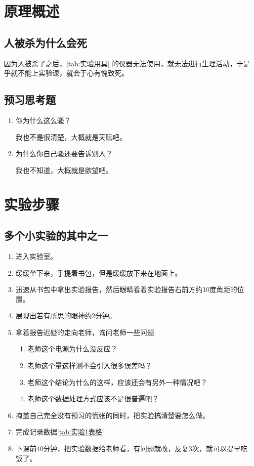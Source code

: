 \documentclass[no-math,zihao = -4]{ctexart} %
\begin{document}
\section{原理概述}
    \subsection{人被杀为什么会死}
        因为人被杀了之后，\autoref{tab:实验用具} 的仪器无法使用，就无法进行生理活动，于是乎就不能上实验课，就会于心有愧致死。

    \subsection{预习思考题}
        \begin{enumerate}
            \item 你为什么这么骚？
            \begin{ans}
                我也不是很清楚，大概就是天赋吧。
            \end{ans}

            \item 为什么你自己骚还要告诉别人？
            \begin{ans}
                我也不知道，大概就是欲望吧。
            \end{ans}
        \end{enumerate}
\section{实验步骤}
    \subsection{多个小实验的其中之一}
        \begin{enumerate}
            \item 进入实验室。
            \item 缓缓坐下来，手提着书包，但是缓缓放下来在地面上。
            \item 迅速从书包中拿出实验报告，然后眼睛看着实验报告右前方约10度角距的位置。
            \item 展现出若有所思的眼神约2分钟。
            \item 拿着报告迟疑的走向老师，询问老师一些问题
                \begin{enumerate}
                    \item 老师这个电源为什么没反应？
                    \item 老师这个量这样测不会引入很多误差吗？
                    \item 老师这个结论为什么的这样，应该还会有另外一种情况吧？
                    \item 老师这个数据处理方式应该不是很普遍吧？
                \end{enumerate}
            \item 掩盖自己完全没有预习的慌张的同时，把实验搞清楚要怎么做。
            \item 完成记录数据\autoref{tab:实验1表格}
            \item 下课前40分钟，把实验数据给老师看，有问题就改，反复3次，就可以提早吃饭了。
        \end{enumerate}
\end{document}

